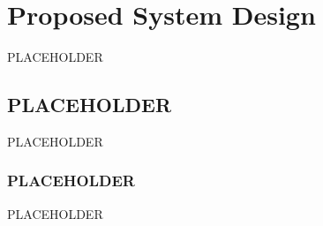 \chapter{Proposed System Design}\label{ch:proposed-system-design}

PLACEHOLDER

\section{PLACEHOLDER}

PLACEHOLDER

\subsection{PLACEHOLDER}

PLACEHOLDER

